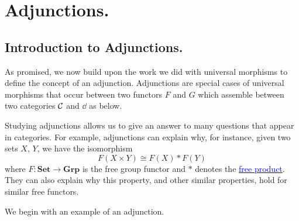 \chapter{Adjunctions.}

\section{Introduction to Adjunctions.}
As promised, we now build upon the work we did with universal morphisms to 
define the concept of an adjunction. Adjunctions are special cases of universal morphisms 
that occur between two functors $F$ and $G$ which assemble between two categories $\mathcal{C}$ and $\dd$ 
as below. 
\begin{center}
\end{center}
Studying adjunctions allows us to give an answer to many questions that appear 
in categories. For example, adjunctions can explain why, for instance, given 
two sets $X$, $Y$, we have the isomorphism 
\[
    F(X \times Y) \cong F(X) * F(Y)    
\]
where $F: \textbf{Set} \to \textbf{Grp}$ is the free group functor and $*$ denotes the 
\hyperref[example:free_product]{\textcolor{blue}{free product}}. They can also 
explain why this property, and other similar properties, hold for similar free functors. 

We begin with an example of an adjunction. 

